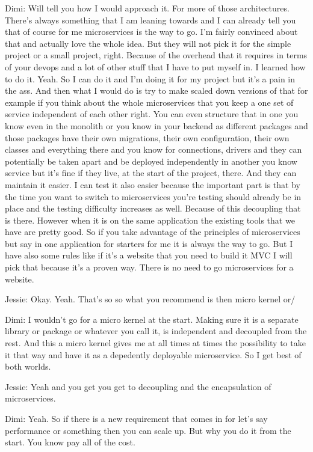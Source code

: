 Dimi: Will tell you how I would approach it. For more of those architectures. There's always something that I am leaning towards and I can already tell you that of course for me microservices is the way to go. I'm fairly convinced about that and actually love the whole idea. But they will not pick it for the simple project or a small project, right. Because of the overhead that it requires in terms of your devops and a lot of other stuff that I have to put myself in. I learned how to do it. Yeah. So I can do it and I'm doing it for my project but it's a pain in the ass. And then what I would do is try to make scaled down versions of that for example if you think about the whole microservices that you keep a one set of service independent of each other right. You can even structure that in one you know even in the monolith or you know in your backend as different packages and those packages have their own migrations, their own configuration, their own classes and everything there and you know for connections, drivers and they can potentially be taken apart and be deployed independently in another you know service but it's fine if they live, at the start of the project, there. And they can maintain it easier. I can test it also easier because the important part is that by the time you want to switch to microservices you're testing should already be in place and the testing difficulty increases as well. Because of this decoupling that is there. However when it is on the same application the existing tools that we have are pretty good. So if you take advantage of the principles of microservices but say in one application for starters for me it is always the way to go. But I have also some rules like if it's a website that you need to build it MVC I will pick that because it's a proven way. There is no need to go microservices for a website.

Jessie: Okay. Yeah. That's so so what you recommend is then micro kernel or/

Dimi: I wouldn't go for a micro kernel at the start. Making sure it is a separate library or package or whatever you call it, is independent and decoupled from the rest. And this a micro kernel gives me at all times at times the possibility to take it that way and have it as a depedently deployable microservice. So I get best of both worlds.

Jessie: Yeah and you get you get to decoupling and the encapsulation of microservices.

Dimi: Yeah. So if there is a new requirement that comes in for let's say performance or something then you can scale up. But why you do it from the start. You know pay all of the cost.

